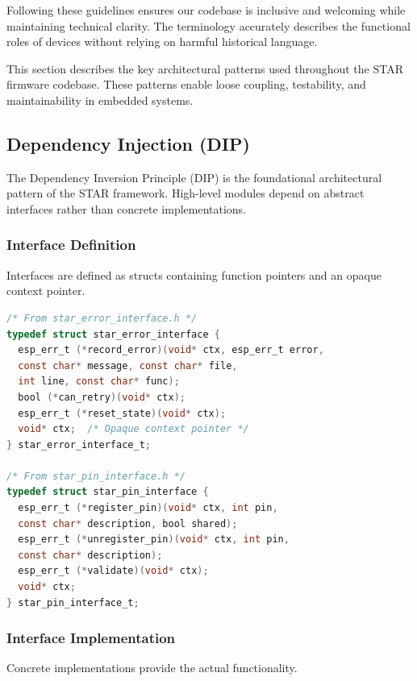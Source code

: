 Following these guidelines ensures our codebase is inclusive and welcoming while maintaining technical clarity. The terminology accurately describes the functional roles of devices without relying on harmful historical language.



This section describes the key architectural patterns used throughout the STAR firmware codebase. These patterns enable loose coupling, testability, and maintainability in embedded systems.

\subsection{Dependency Injection (DIP)}

The Dependency Inversion Principle (DIP) is the foundational architectural pattern of the STAR framework. High-level modules depend on abstract interfaces rather than concrete implementations.

\subsubsection{Interface Definition}

Interfaces are defined as structs containing function pointers and an opaque context pointer.

\begin{lstlisting}[language=C]
/* From star_error_interface.h */
typedef struct star_error_interface {
  esp_err_t (*record_error)(void* ctx, esp_err_t error,
  const char* message, const char* file,
  int line, const char* func);
  bool (*can_retry)(void* ctx);
  esp_err_t (*reset_state)(void* ctx);
  void* ctx;  /* Opaque context pointer */
} star_error_interface_t;

/* From star_pin_interface.h */
typedef struct star_pin_interface {
  esp_err_t (*register_pin)(void* ctx, int pin,
  const char* description, bool shared);
  esp_err_t (*unregister_pin)(void* ctx, int pin,
  const char* description);
  esp_err_t (*validate)(void* ctx);
  void* ctx;
} star_pin_interface_t;
\end{lstlisting}

\subsubsection{Interface Implementation}

Concrete implementations provide the actual functionality.

